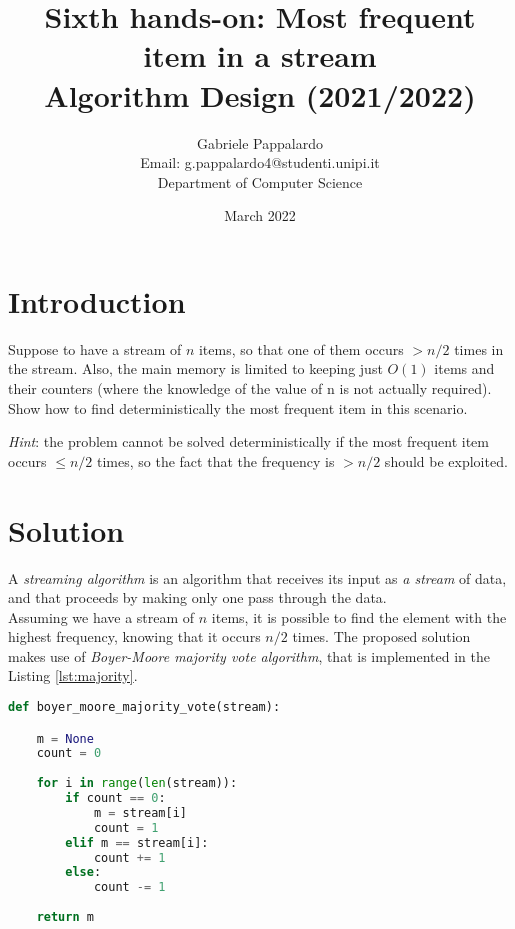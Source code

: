 \documentclass{article}
\title{Sixth hands-on: Most frequent item in a stream \\[1ex] \large Algorithm Design (2021/2022)}
\author{Gabriele Pappalardo\\Email: g.pappalardo4@studenti.unipi.it\\Department of Computer Science}
\date{March 2022}
\begin{document}
\maketitle

\section{Introduction}

Suppose to have a stream of $n$ items, so that one of them occurs $ > n/2 $ times in the stream. 
Also, the main memory is limited to keeping just $O(1)$ items and their counters (where the knowledge of the value of n is not actually required). Show how to find deterministically the most frequent item in this scenario.
\newline

\noindent \textit{Hint}: the problem cannot be solved deterministically if the most frequent item occurs $\le n/2$ times, so the fact that the frequency is $> n/2$ should be exploited.

\section{Solution}
A \textit{streaming algorithm} is an algorithm that receives its input as \textit{a stream} of data, 
and that proceeds by making only one pass through the data.\\

\noindent Assuming we have a stream of $n$ items, it is possible to find the element with the highest frequency, knowing that it occurs $n/2$ times. The proposed solution makes use of \textit{Boyer-Moore majority vote algorithm}, that is implemented in the Listing \ref{lst:majority}.

\begin{lstlisting}[language=Python,caption=``Boyer-Moore majority vote algorithm'',label={lst:majority}]
def boyer_moore_majority_vote(stream):

	m = None
	count = 0
	
	for i in range(len(stream)):
		if count == 0:
			m = stream[i]
			count = 1
		elif m == stream[i]:
			count += 1
		else:
			count -= 1
	
	return m
\end{lstlisting}
\end{document}
